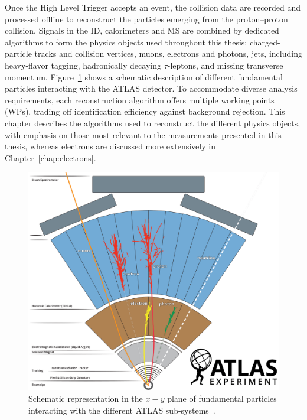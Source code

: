 \newcommand*{\antikt}{anti-$\kappa_{t}$\xspace}
\newcommand*{\etmiss}{$E^{\text{miss}}_{\text{T}}$\xspace}
\newcommand*{\tauhadvis}{$\tau_{\text{had-vis}}$\xspace}
\newcommand*{\tauhad}{$\tau_{\text{had}}$\xspace}
\newcommand*{\ttbar}{$\bar{t}t$\xspace}

Once the High Level Trigger accepts an event, the collision data are recorded and processed offline to reconstruct the particles emerging from the proton–proton collision. 
Signals in the ID, calorimeters and MS are combined by dedicated algorithms to form the physics objects used throughout this thesis: charged-particle tracks and collision vertices, muons, electrons and photons, jets, including heavy-flavor tagging, hadronically decaying $\tau$-leptons, and missing transverse momentum. Figure~\ref{fig:reco} shows a schematic description of different fundamental particles interacting with the \acrshort{ATLAS} detector. 
To accommodate diverse analysis requirements, each reconstruction algorithm offers multiple working points (WPs), trading off identification efficiency against background rejection. This chapter describes the algorithms used to reconstruct the different physics objects, with emphasis on those most relevant to the measurements presented in this thesis, whereas electrons are discussed more extensively in Chapter~\ref{chap:electrons}.

\begin{figure}[htbp]
  \centering
  \includegraphics[width=1.0\textwidth]{images/atlas_particles.png}
  \caption{Schematic representation in the $x-y$ plane of fundamental particles interacting with the different ATLAS sub-systems~\cite{Bianchi:2837191}.}
  \label{fig:reco}
 \end{figure}

